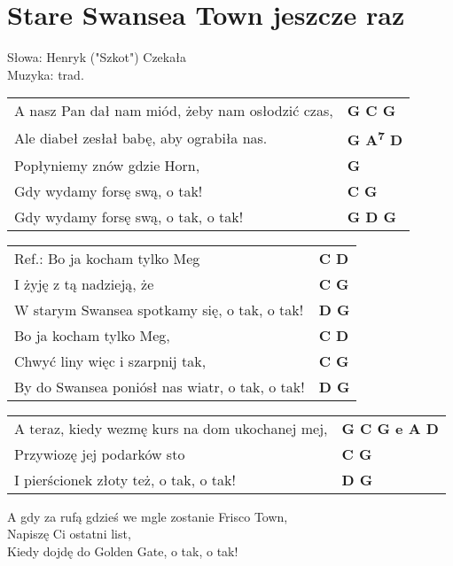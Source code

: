 \section{Stare Swansea Town jeszcze raz}

Słowa: Henryk ("Szkot") Czekała\\
Muzyka:  trad.

\vspace{2em}
\begin{tabular}{@{}p{9cm}@{}l@{}}
A nasz Pan dał nam miód, żeby nam osłodzić czas, & \bfseries G C G \\
Ale diabeł zesłał babę, aby ograbiła nas. & \bfseries G A\textsuperscript{7} D \\
Popłyniemy znów gdzie Horn, & \bfseries G \\
Gdy wydamy forsę swą, o tak! & \bfseries C G \\
Gdy wydamy forsę swą, o tak, o tak! & \bfseries G D G \\
\end{tabular}

\vspace{1em}
\begin{tabular}{@{}p{9cm}@{}l@{}}
Ref.: Bo ja kocham tylko Meg & \bfseries C D \\
I żyję z tą nadzieją, że & \bfseries C G \\
W starym Swansea spotkamy się, o tak, o tak! & \bfseries D G \\
Bo ja kocham tylko Meg, & \bfseries C D \\
Chwyć liny więc i szarpnij tak, & \bfseries C G \\
By do Swansea poniósł nas wiatr, o tak, o tak! & \bfseries D G \\
\end{tabular}

\vspace{1em}
\begin{tabular}{@{}p{9cm}@{}l@{}}
A teraz, kiedy wezmę kurs na dom ukochanej mej, & \bfseries G C G e A D \\
Przywiozę jej podarków sto & \bfseries C G \\
I pierścionek złoty też, o tak, o tak! & \bfseries D G \\
\end{tabular}

\vspace{1em}
A gdy za rufą gdzieś we mgle zostanie Frisco Town, \\
Napiszę Ci ostatni list, \\
Kiedy dojdę do Golden Gate, o tak, o tak! \\

